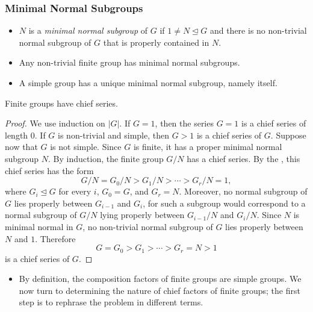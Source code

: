 \documentclass[../Odyssey_Project.tex]{subfiles}
\begin{document}
\subsubsection*{Minimal Normal Subgroups}
\begin{itemize}
  \item $N$ is a \emph{minimal normal subgroup} of $G$ if $1 \neq N \trianglelefteq G$ and there is no non-trivial normal subgroup of $G$ that is properly contained in $N$.
  \item Any non-trivial finite group has minimal normal subgroups.
  \item A simple group has a unique minimal normal subgroup, namely itself.
\end{itemize}

\begin{proposition}
\label{prop:10.3}
Finite groups have chief series.
\end{proposition}
\begin{proof}
We use induction on $\lvert G\rvert$. If $G=1$, then the series $G=1$ is a chief series of length $0$. If $G$ is non-trivial and simple, then $G>1$ is a chief series of $G$. Suppose now that $G$ is not simple. Since $G$ is finite, it has a proper minimal normal subgroup $N$. By induction, the finite group $G/N$ has a chief series. By the , this chief series has the form
\[
  G/N=G_0/N>G_1/N>\cdots>G_r/N=1,
\]
where $G_i\trianglelefteq G$ for every $i$, $G_0=G$, and $G_r=N$. Moreover, no normal subgroup of $G$ lies properly between $G_{i-1}$ and $G_i$, for such a subgroup would correspond to a normal subgroup of $G/N$ lying properly between $G_{i-1}/N$ and $G_i/N$. Since $N$ is minimal normal in $G$, no non-trivial normal subgroup of $G$ lies properly between $N$ and $1$. Therefore
\[
  G=G_0>G_1>\cdots>G_r=N>1
\]
is a chief series of $G$.
\end{proof}

\begin{itemize}
  \item By definition, the composition factors of finite groups are simple groups. We now turn to determining the nature of chief factors of finite groups; the first step is to rephrase the problem in different terms.
\end{itemize}
\end{document}
